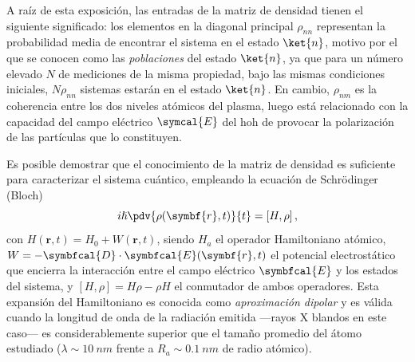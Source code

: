 A raíz de esta exposición, las entradas de la matriz de densidad tienen el siguiente significado: los elementos en la diagonal principal $\rho_{nn}$ representan la probabilidad media de encontrar el sistema en el estado $\ket{n}$, motivo por el que se conocen como las \emph{poblaciones} del estado $\ket{n}$, ya que para un número elevado $N$ de mediciones de la misma propiedad, bajo las mismas condiciones iniciales, $N \rho_{nn}$ sistemas estarán en el estado $\ket{n}$. En cambio, $\rho_{nm}$ es la coherencia entre los dos niveles atómicos del plasma, luego está relacionado con la capacidad del campo eléctrico $\symcal{E}$ del \acrshort{hoh} de provocar la polarización de las partículas que lo constituyen.

Es posible demostrar \autocite{Cohen-Tannoudji2019} que el conocimiento de la matriz de densidad es suficiente para caracterizar el sistema cuántico, empleando la ecuación de Schrödinger (Bloch)
\begin{equation}\label{eq:3.12}
  i \hslash \pdv{\rho(\symbf{r},t)}{t} = \left[H,\rho\right],
\end{equation}
con $H(\symbf{r},t) = H_{0} + W(\symbf{r},t)$, siendo $H_{a}$ el operador Hamiltoniano atómico, $W = -\symbfcal{D} \cdot \symbfcal{E}(\symbf{r},t)$ el potencial electrostático que encierra la interacción entre el campo eléctrico $\symbfcal{E}$ y los estados del sistema, y $\left[H, \rho\right] = H \rho - \rho H$ el conmutador de ambos operadores. Esta expansión del Hamiltoniano es conocida como \emph{aproximación dipolar} \autocite{Jackson1998} y es válida cuando la longitud de onda de la radiación emitida ---rayos X blandos en este caso--- es considerablemente superior que el tamaño promedio del átomo estudiado ($\lambda \sim \qty{10}{nm}$ frente a $R_{a} \sim \qty{0.1}{nm}$ de radio atómico). 


